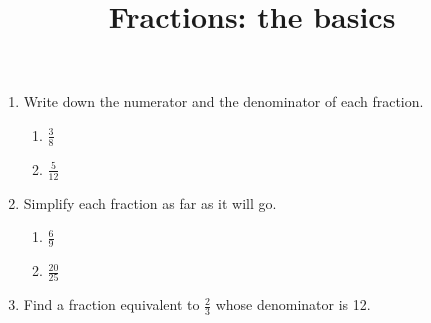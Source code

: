 \documentclass[12pt]{article}
\begin{document}

\title{Fractions: the basics}
\date{}
\maketitle

\begin{enumerate}[label=\textbf{Q\arabic*.}]

\item Write down the numerator and the denominator of each fraction.
\begin{enumerate}[label=(\alph*)]
    \item \( \frac{3}{8} \)
    \item \( \frac{5}{12} \)
\end{enumerate}

\item Simplify each fraction as far as it will go.
\begin{enumerate}[label=(\alph*)]
    \item \( \frac{6}{9} \)
    \item \( \frac{20}{25} \)
\end{enumerate}

\item Find a fraction equivalent to \( \frac{2}{3} \) whose denominator is 12.

\end{enumerate}
\end{document}
